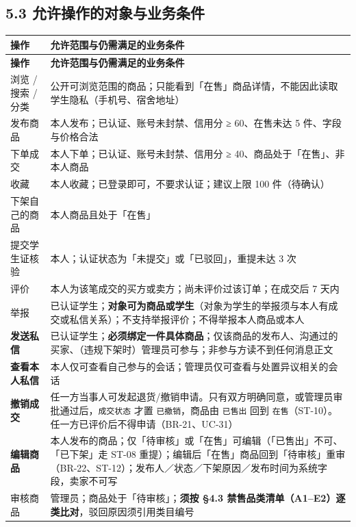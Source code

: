 \documentclass[12pt,a4paper]{ctexart}
\begin{document}
\subsection*{5.3 允许操作的对象与业务条件}

{\scriptsize
\begin{longtable}{|p{2.75cm}|p{13.25cm}|}
\hline
\textbf{操作} & \textbf{允许范围与仍需满足的业务条件} \\
\hline
\endfirsthead
\hline
\textbf{操作} & \textbf{允许范围与仍需满足的业务条件} \\
\hline
\endhead
\hline
\endfoot
浏览 / 搜索 / 分类 & 公开可浏览范围的商品；只能看到「在售」商品详情，不能因此读取学生隐私（手机号、宿舍地址） \\
\hline
发布商品 & 本人发布；已认证、账号未封禁、信用分 ≥ 60、在售未达 5 件、字段与价格合法 \\
\hline
下单成交 & 本人下单；已认证、账号未封禁、信用分 ≥ 40、商品处于「在售」、非本人商品 \\
\hline
收藏 & 本人收藏；已登录即可，不要求认证；建议上限 100 件（待确认） \\
\hline
下架自己的商品 & 本人商品且处于「在售」 \\
\hline
提交学生证核验 & 本人；认证状态为「未提交」或「已驳回」，重提未达 3 次 \\
\hline
评价 & 本人为该笔成交的买方或卖方；尚未评价过该订单；在成交后 7 天内 \\
\hline
举报 & 已认证学生；\textbf{对象可为商品或学生}（对象为学生的举报须与本人有成交或私信关系）；不支持举报评价；不得举报本人商品或本人 \\
\hline
\textbf{发送私信} & 已认证学生；\textbf{必须绑定一件具体商品}；仅该商品的发布人、沟通过的买家、（违规下架时）管理员可参与；非参与方读不到任何消息正文 \\
\hline
\textbf{查看本人私信} & 本人仅可查看自己参与的会话；管理员仅可查看与处置异议相关的会话 \\
\hline
\textbf{撤销成交} & 任一方当事人可发起退货/撤销申请。只有双方明确同意，或管理员审批通过后，\texttt{成交状态} 才置 \texttt{已撤销}，商品由 \texttt{已售出} 回到 \texttt{在售}（ST-10）。任一方已评价后不得申请（BR-21、UC-31） \\
\hline
\textbf{编辑商品} & 本人发布的商品；仅「待审核」或「在售」可编辑（「已售出」不可、「已下架」走 ST-08 重提）；编辑后「在售」商品回到「待审核」重审（BR-22、ST-12）；发布人／状态／下架原因／发布时间为系统字段，卖家不可写 \\
\hline
审核商品 & 管理员；商品处于「待审核」；\textbf{须按 §4.3 禁售品类清单（A1–E2）逐类比对}，驳回原因须引用类目编号 \\

\end{longtable}}
\end{document}
